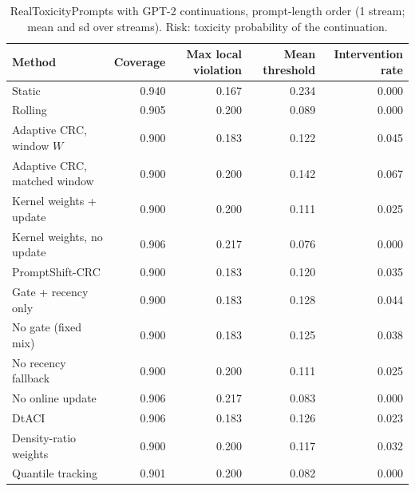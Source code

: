 \begin{table}[H]
\centering
\small
\caption{RealToxicityPrompts with GPT-2 continuations, prompt-length order (1 stream; mean and sd over streams). Risk: toxicity probability of the continuation.}
\label{tab:rtp_length_ascending}
\begin{tabular}{lrrrr}
\toprule
Method & Coverage & Max local violation & Mean threshold & Intervention rate \\
\midrule
Static & 0.940 & 0.167 & 0.234 & 0.000 \\
Rolling & 0.905 & 0.200 & 0.089 & 0.000 \\
Adaptive CRC, window $W$ & 0.900 & 0.183 & 0.122 & 0.045 \\
Adaptive CRC, matched window & 0.900 & 0.200 & 0.142 & 0.067 \\
Kernel weights + update & 0.900 & 0.200 & 0.111 & 0.025 \\
Kernel weights, no update & 0.906 & 0.217 & 0.076 & 0.000 \\
PromptShift-CRC & 0.900 & 0.183 & 0.120 & 0.035 \\
Gate + recency only & 0.900 & 0.183 & 0.128 & 0.044 \\
No gate (fixed mix) & 0.900 & 0.183 & 0.125 & 0.038 \\
No recency fallback & 0.900 & 0.200 & 0.111 & 0.025 \\
No online update & 0.906 & 0.217 & 0.083 & 0.000 \\
DtACI & 0.906 & 0.183 & 0.126 & 0.023 \\
Density-ratio weights & 0.900 & 0.200 & 0.117 & 0.032 \\
Quantile tracking & 0.901 & 0.200 & 0.082 & 0.000 \\
\bottomrule
\end{tabular}
\end{table}


